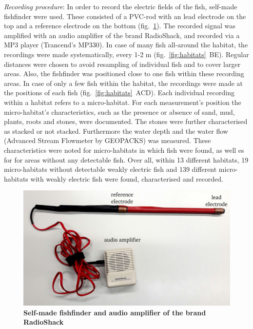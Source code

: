 \textit{Recording procedure}: In order to record the electric fields of the fish, self-made fishfinder were used. These consisted of a PVC-rod with an lead electrode on the top and a reference electrode on the bottom (fig.~\ref{fig:fishfinder}). The recorded signal was amplified with an audio amplifier of the brand RadioShack, and recorded via a MP3 player (Trancend’s MP330).
In case of many fish all-around the habitat, the recordings were made systematically, every 1-2 m (fig.~\ref{fig:habitats}~BE). Regular distances were chosen to avoid resampling of individual fish and to cover larger areas. Also, the fishfinder was positioned close to one fish within these recording areas. In case of only a few fish within the habitat, the recordings were made at the positions of each fish (fig.~\ref{fig:habitats}~ACD). Each individual recording within a habitat refers to a micro-habitat. For each measurement’s position the micro-habitat’s characteristics, such as the presence or absence of sand, mud, plants, roots and stones, were documented. The stones were further characterised as stacked or not stacked. Furthermore the water depth and the water flow (Advanced Stream Flowmeter by GEOPACKS) was measured. These characteristics were noted for micro-habitats in which fish were found, as well es for for areas without any detectable fish.
Over all, within 13 different habitats, 19 micro-habitats without detectable weakly electric fish and 139 different micro-habitats with weakly electric fish were found, characterised and recorded.

\begin{figure}[H]
    \centering
    \includegraphics[width=\textwidth]{pictures/Methods/fishfinder.png}
    \caption{\textbf{Self-made fishfinder and audio amplifier of the brand RadioShack}}
    \label{fig:fishfinder}
\end{figure}{}

